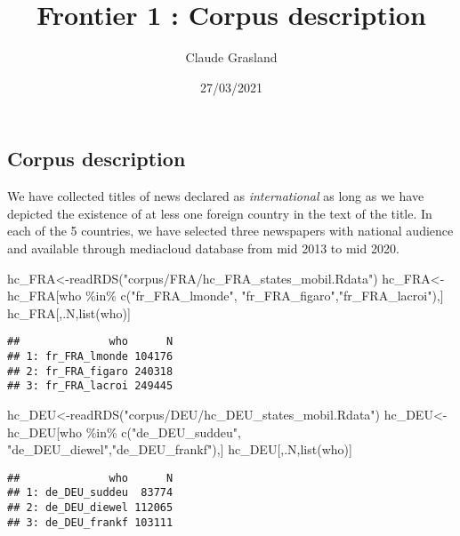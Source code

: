 \documentclass[
]{article}
\title{Frontier 1 : Corpus description}
\author{Claude Grasland}
\date{27/03/2021}
\newenvironment{Shaded}{\begin{snugshade}}{\end{snugshade}}
\newcommand{\FunctionTok}[1]{\textcolor[rgb]{0.00,0.00,0.00}{#1}}
\newcommand{\NormalTok}[1]{#1}
\newcommand{\OtherTok}[1]{\textcolor[rgb]{0.56,0.35,0.01}{#1}}
\newcommand{\SpecialCharTok}[1]{\textcolor[rgb]{0.00,0.00,0.00}{#1}}
\newcommand{\StringTok}[1]{\textcolor[rgb]{0.31,0.60,0.02}{#1}}
\begin{document}
\maketitle

\hypertarget{corpus-description}{%
\subsection{Corpus description}\label{corpus-description}}

We have collected titles of news declared as \emph{international} as
long as we have depicted the existence of at less one foreign country in
the text of the title. In each of the 5 countries, we have selected
three newspapers with national audience and available through mediacloud
database from mid 2013 to mid 2020.

\begin{Shaded}
\begin{Highlighting}[]
\NormalTok{hc\_FRA}\OtherTok{\textless{}{-}}\FunctionTok{readRDS}\NormalTok{(}\StringTok{"corpus/FRA/hc\_FRA\_states\_mobil.Rdata"}\NormalTok{)}
\NormalTok{hc\_FRA}\OtherTok{\textless{}{-}}\NormalTok{hc\_FRA[who }\SpecialCharTok{\%in\%}  \FunctionTok{c}\NormalTok{(}\StringTok{"fr\_FRA\_lmonde"}\NormalTok{, }\StringTok{"fr\_FRA\_figaro"}\NormalTok{,}\StringTok{"fr\_FRA\_lacroi"}\NormalTok{),]}
\NormalTok{hc\_FRA[,.N,}\FunctionTok{list}\NormalTok{(who)]}
\end{Highlighting}
\end{Shaded}

\begin{verbatim}
##              who      N
## 1: fr_FRA_lmonde 104176
## 2: fr_FRA_figaro 240318
## 3: fr_FRA_lacroi 249445
\end{verbatim}

\begin{Shaded}
\begin{Highlighting}[]
\NormalTok{hc\_DEU}\OtherTok{\textless{}{-}}\FunctionTok{readRDS}\NormalTok{(}\StringTok{"corpus/DEU/hc\_DEU\_states\_mobil.Rdata"}\NormalTok{)}
\NormalTok{hc\_DEU}\OtherTok{\textless{}{-}}\NormalTok{hc\_DEU[who }\SpecialCharTok{\%in\%}  \FunctionTok{c}\NormalTok{(}\StringTok{"de\_DEU\_suddeu"}\NormalTok{, }\StringTok{"de\_DEU\_diewel"}\NormalTok{,}\StringTok{"de\_DEU\_frankf"}\NormalTok{),]}
\NormalTok{hc\_DEU[,.N,}\FunctionTok{list}\NormalTok{(who)]}
\end{Highlighting}
\end{Shaded}

\begin{verbatim}
##              who      N
## 1: de_DEU_suddeu  83774
## 2: de_DEU_diewel 112065
## 3: de_DEU_frankf 103111
\end{verbatim}
\end{document}
